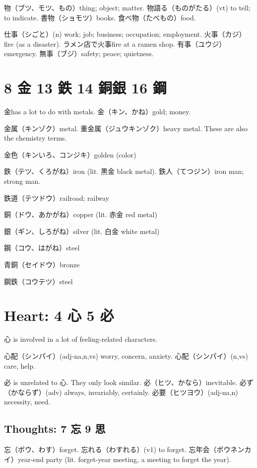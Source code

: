 物（ブツ、モツ、もの）thing; object; matter.
物語る（ものがたる）(vt) to tell; to indicate.
書物（ショモツ）books.
食べ物（たべもの）food.

仕事（シごと）(n) work; job; business; occupation; employment.
火事（カジ）fire (as a disaster).
ラメン店で火事fire at a ramen shop.
有事（ユウジ）emergency.
無事（ブジ）safety; peace; quietness.

\section{8 金 13 鉄 14 銅銀 16 鋼}

金has a lot to do with metals.
金（キン、かね）gold; money.

金属（キンゾク）metal.
重金属（ジュウキンゾク）heavy metal.
These are also the chemistry terms.

金色（キンいろ、コンジキ）golden (color)

鉄（テツ、くろがね）iron (lit. 黒金 black metal).
鉄人（てつジン）iron man; strong man.

鉄道（テツドウ）railroad; railway

銅（ドウ、あかがね）copper (lit. 赤金 red metal)

銀（ギン、しろがね）silver (lit. 白金 white metal)

鋼（コウ、はがね）steel

青銅（セイドウ）bronze

鋼鉄（コウテツ）steel

\section{Heart: 4 心 5 必}

心 is involved in a lot of feeling-related characters.

心配（シンパイ）(adj-na,n,vs) worry, concern, anxiety.
心配（シンパイ）(n,vs) care, help.

必 is unrelated to 心. They only look similar.
必（ヒツ、かなら）inevitable.
必ず（かならず）(adv) always, invariably, certainly.
必要（ヒツヨウ）(adj-na,n) necessity, need.

\subsection{Thoughts: 7 忘 9 思}

忘（ボウ、わす）forget.
忘れる（わすれる）(v1) to forget.
忘年会（ボウネンカイ）year-end party
(lit. forget-year meeting, a meeting to forget the year).

